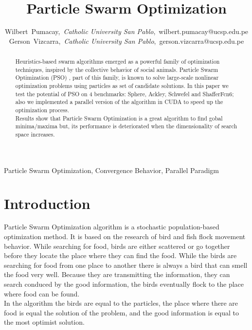 \documentclass[journal]{IEEEtran}
\begin{document}
\title{Particle Swarm Optimization}

\author{Wilbert~Pumacay,~\textit{Catholic University San Pablo},~wilbert.pumacay@ucsp.edu.pe\\
        Gerson~Vizcarra,~\textit{Catholic University San Pablo},~gerson.vizcarra@ucsp.edu.pe}

\maketitle

\begin{abstract}
Heuristics-based swarm algorithms emerged as a powerful family of optimization techniques, inspired by the collective behavior of social animals. Particle Swarm Optimization (PSO) , part of this family, is known to solve large-scale nonlinear optimization problems using particles as set of candidate solutions. In this paper we test the potential of PSO on 4 benchmarks: Sphere, Ackley, Schwefel and ShafferFcn6; also we implemented a parallel version of the algorithm in CUDA to speed up the optimization process.
\\
Results show that Particle Swarm Optimization is a great algorithm to find gobal minima/maxima but, its performance is deteriorated when the dimensionality of search space increases.
\end{abstract}

\begin{IEEEkeywords}
Particle Swarm Optimization, Convergence Behavior, Parallel Paradigm
\end{IEEEkeywords}


\section{Introduction}

 Particle Swarm Optimization algorithm is a stochastic population-based optimization method. It is based on the research of bird and fish flock movement behavior. While searching for food, birds are either scattered or go together before they locate the place where they can find the food. While the birds are searching for food from one place to another there is always a bird that can smell the food very well. Because they are transmitting the information, they can search conduced by the good information, the birds eventually flock to the place where food can be found.\\
In the algorithm the birds are equal to the particles, the place where there are food is equal the solution of the problem, and the good information is equal to the most optimist solution.\\
\end{document}

